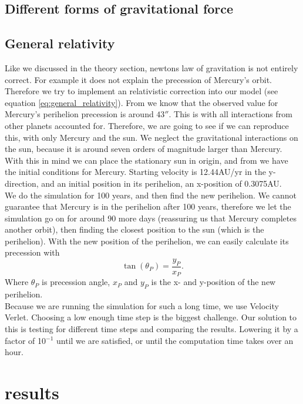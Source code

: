 \documentclass[reprint, english,notitlepage,nofootinbib]{revtex4-1}  %
\begin{document}
\subsection{Different forms of gravitational force}

\subsection{General relativity}
Like we discussed in the theory section, newtons law of gravitation is not entirely correct. For example it does not explain the precession of Mercury's orbit. Therefore we try to implement an relativistic correction into our model (see equation \eqref{eq:general_relativity}). From \citep{oppgavetekst} we know that the observed value for Mercury's perihelion precession is around $43''$. This is with all interactions from other planets accounted for. Therefore, we are going to see if we can reproduce this, with only Mercury and the sun. We neglect the gravitational interactions on the sun, because it is around seven orders of magnitude larger than Mercury. With this in mind we can place the stationary sun in origin, and from \citep{oppgavetekst} we have the initial conditions for Mercury. Starting velocity is 12.44AU/yr in the y-direction, and an initial position in its perihelion, an x-position of 0.3075AU.
\\
We do the simulation for 100 years, and then find the new perihelion. We cannot guarantee that Mercury is in the perihelion after 100 years, therefore we let the simulation go on for around 90 more days (reassuring us that Mercury completes another orbit), then finding the closest position to the sun (which is the perihelion). With the new position of the perihelion, we can easily calculate its precession with
\begin{equation*}
	\tan(\theta_P) = \frac{y_P}{x_P}.
\end{equation*}
Where $\theta_P$ is precession angle, $x_P$ and $y_P$ is the x- and y-position of the new perihelion.
\\
Because we are running the simulation for such a long time, we use Velocity Verlet. Choosing a low enough time step is the biggest challenge. Our solution to this is testing for different time steps and comparing the results. Lowering it by a factor of 10$^{-1}$ until we are satisfied, or until the computation time takes over an hour.

\section{results}
\end{document}
